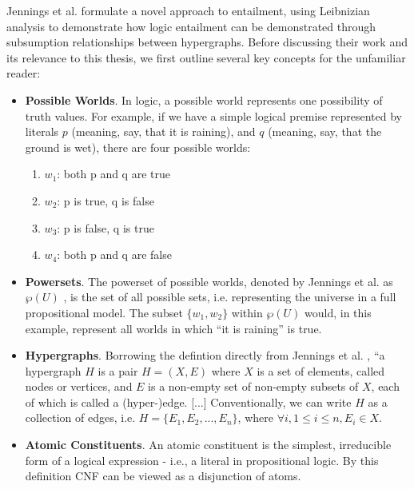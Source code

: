 \documentclass[12pt,twoside]{report}
\begin{document}
Jennings et al. \cite{leibnizianAnalysis} formulate a novel approach to entailment, using Leibnizian analysis to demonstrate how logic entailment can be demonstrated through subsumption relationships between hypergraphs. Before discussing their work and its relevance to this thesis, we first outline several key concepts for the unfamiliar reader: 
\begin{itemize}[itemsep=0pt]
    \item \textbf{Possible Worlds}. In logic, a possible world represents one possibility of truth values. For example, if we have a simple logical premise represented by literals $p$ (meaning, say, that it is raining), and $q$ (meaning, say, that the ground is wet), there are four possible worlds:
    \begin{enumerate}[topsep=0pt, itemsep=0pt]
        \item $w_1$: both p and q are true
        \item $w_2$: p is true, q is false
        \item $w_3$: p is false, q is true
        \item $w_4$: both p and q are false
    \end{enumerate}
    \item \textbf{Powersets}. The powerset of possible worlds, denoted by Jennings et al. as $\wp(U)$ \cite{leibnizianAnalysis}, is the set of all possible sets, i.e. representing the universe in a full propositional model. The subset $\{w_1, w_2\}$ within $\wp(U)$ would, in this example, represent all worlds in which ``it is raining'' is true. 
    \item \textbf{Hypergraphs}. Borrowing the defintion directly from Jennings et al. \cite{leibnizianAnalysis}, ``a hypergraph $H$ is a pair $H=(X, E)$ where $X$ is a set of elements, called nodes or vertices, and $E$ is a non-empty set of non-empty subsets of $X$, each of which is called a (hyper-)edge. [...] Conventionally, we can write $H$ as a collection of edges, i.e. $H=\{E_1, E_2, ..., E_n\}$, where $\forall i, 1 \leq i \leq n, E_i \in X$. 
    \item \textbf{Atomic Constituents}. An atomic constituent is the simplest, irreducible form of a logical expression - i.e., a literal in propositional logic. By this definition CNF can be viewed as a disjunction of atoms.
\end{itemize}
\end{document}
